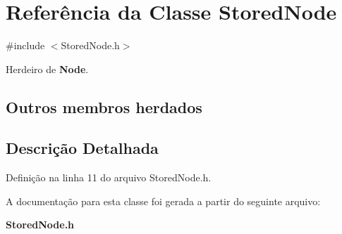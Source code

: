 \section{Referência da Classe Stored\+Node}
\label{class_stored_node}


{\ttfamily \#include $<$Stored\+Node.\+h$>$}



Herdeiro de {\bf Node}.

\subsection*{Outros membros herdados}


\subsection{Descrição Detalhada}


Definição na linha 11 do arquivo Stored\+Node.\+h.



A documentação para esta classe foi gerada a partir do seguinte arquivo\+:\begin{DoxyCompactItemize}
\item 
{\bf Stored\+Node.\+h}\end{DoxyCompactItemize}
